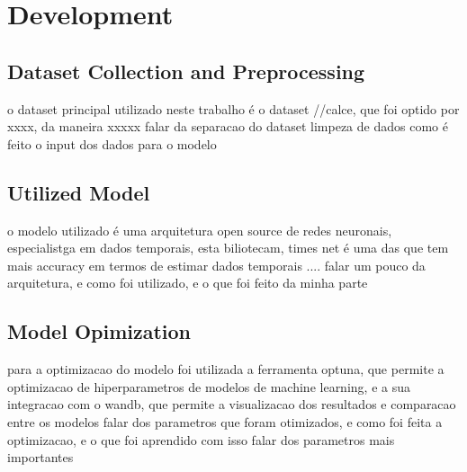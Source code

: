 \chapter{Development}
\label{ch:Development}
\lipsum[1]
\section{Dataset Collection and Preprocessing}

o dataset principal utilizado neste trabalho é o dataset //calce, que foi optido por xxxx, da maneira xxxxx
falar da separacao do dataset
limpeza de dados
como é feito o input dos dados para o modelo
\section{Utilized Model}
o modelo utilizado é uma arquitetura open source de redes neuronais, especialistga em dados temporais, esta biliotecam, times net é uma das que tem mais accuracy em termos de estimar dados temporais
.... falar um pouco da arquitetura, e como foi utilizado, e o que foi feito da minha parte

\section{Model Opimization}
para a optimizacao do modelo foi utilizada a ferramenta optuna, que permite a optimizacao de hiperparametros de modelos de machine learning, e a sua integracao com o wandb, que permite a visualizacao dos resultados e comparacao entre os modelos
falar dos parametros que foram otimizados, e como foi feita a optimizacao, e o que foi aprendido com isso
falar dos parametros mais importantes




